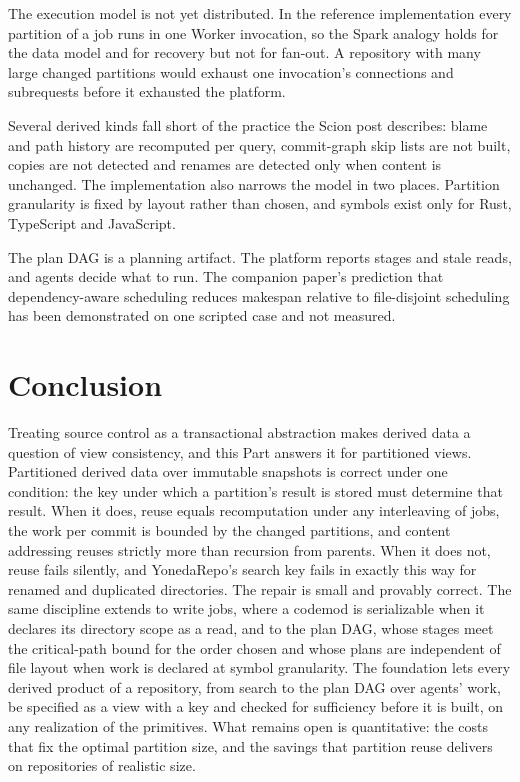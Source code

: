 \documentclass[11pt,letterpaper]{article}
\theoremstyle{definition}
\theoremstyle{remark}
\begin{document}
The execution model is not yet distributed. In the reference implementation every partition of a job runs in one Worker invocation, so the Spark analogy holds for the data model and for recovery but not for fan-out. A repository with many large changed partitions would exhaust one invocation's connections and subrequests before it exhausted the platform.

Several derived kinds fall short of the practice the Scion post describes: blame and path history are recomputed per query, commit-graph skip lists are not built, copies are not detected and renames are detected only when content is unchanged. The implementation also narrows the model in two places. Partition granularity is fixed by layout rather than chosen, and symbols exist only for Rust, TypeScript and JavaScript.

The plan DAG is a planning artifact. The platform reports stages and stale reads, and agents decide what to run. The companion paper's prediction that dependency-aware scheduling reduces makespan relative to file-disjoint scheduling has been demonstrated on one scripted case and not measured.

\section{Conclusion}
\label{sec:pdd:conclusion}

Treating source control as a transactional abstraction makes derived data a question of view consistency, and this Part answers it for partitioned views. Partitioned derived data over immutable snapshots is correct under one condition: the key under which a partition's result is stored must determine that result. When it does, reuse equals recomputation under any interleaving of jobs, the work per commit is bounded by the changed partitions, and content addressing reuses strictly more than recursion from parents. When it does not, reuse fails silently, and YonedaRepo's search key fails in exactly this way for renamed and duplicated directories. The repair is small and provably correct. The same discipline extends to write jobs, where a codemod is serializable when it declares its directory scope as a read, and to the plan DAG, whose stages meet the critical-path bound for the order chosen and whose plans are independent of file layout when work is declared at symbol granularity. The foundation lets every derived product of a repository, from search to the plan DAG over agents' work, be specified as a view with a key and checked for sufficiency before it is built, on any realization of the primitives. What remains open is quantitative: the costs that fix the optimal partition size, and the savings that partition reuse delivers on repositories of realistic size.
\end{document}
